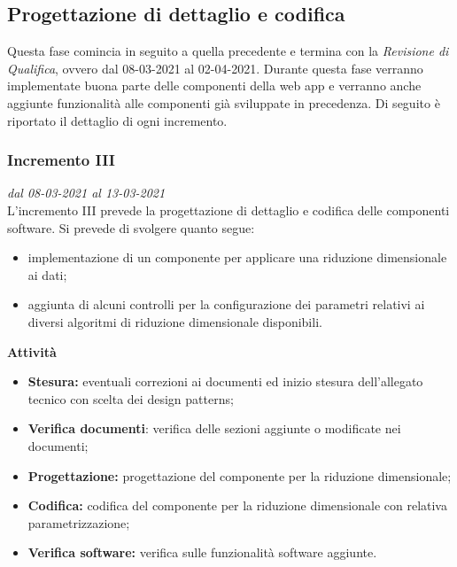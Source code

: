 \subsection{Progettazione di dettaglio e codifica}
Questa fase comincia in seguito a quella precedente e termina con la \textit{Revisione di Qualifica}, ovvero dal 08-03-2021 al 02-04-2021. Durante questa fase verranno implementate buona parte delle componenti della web app e verranno anche aggiunte funzionalità alle componenti già sviluppate in precedenza.
Di seguito è riportato il dettaglio di ogni incremento.

\subsubsection{Incremento III}
\textit{dal 08-03-2021 al 13-03-2021}\\
L'incremento III prevede la progettazione di dettaglio e codifica delle componenti software. Si prevede di svolgere quanto segue:
\begin{itemize}
\item implementazione di un componente per applicare una riduzione dimensionale ai dati;
\item aggiunta di alcuni controlli per la configurazione dei parametri relativi ai diversi algoritmi di riduzione dimensionale disponibili.
\end{itemize}
\textbf{Attività}
\begin{itemize}
\item \textbf{Stesura:} eventuali correzioni ai documenti ed inizio stesura dell'allegato tecnico con scelta dei design patterns;
\item \textbf{Verifica documenti}: verifica delle sezioni aggiunte o modificate nei documenti;
\item \textbf{Progettazione:} progettazione del componente per la riduzione dimensionale;
\item \textbf{Codifica:} codifica del componente per la riduzione dimensionale con relativa parametrizzazione;
\item \textbf{Verifica software:} verifica sulle funzionalità software aggiunte.
\end{itemize}

